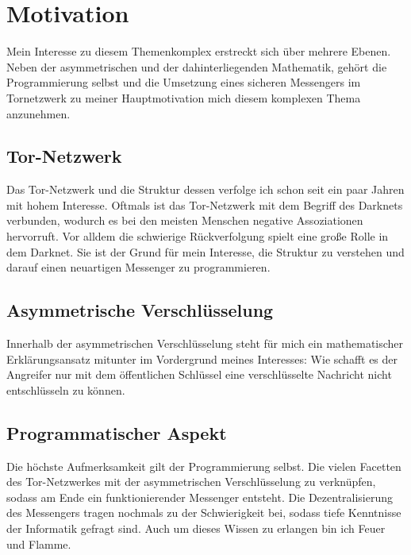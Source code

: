 \documentclass[a4paper,ngerman, headheight=28pt,12pt]{scrartcl}
\newcommand{\vcite}[1]{\cite[vgl.][]{#1}}
\begin{document}

\tableofcontents
\setcounter{page}{0}
\thispagestyle{empty}
\vspace{0.5cm}
\pagebreak

\linenumbers
\modulolinenumbers[5]

\section{Motivation}
Mein Interesse zu diesem Themenkomplex erstreckt sich über mehrere Ebenen. Neben der asymmetrischen und der dahinterliegenden Mathematik, gehört die Programmierung selbst und die Umsetzung eines sicheren Messengers im Tornetzwerk zu meiner Hauptmotivation mich diesem komplexen Thema anzunehmen.
\subsection{Tor-Netzwerk}
Das Tor-Netzwerk und die Struktur dessen verfolge ich schon seit ein paar Jahren mit hohem Interesse. Oftmals ist das Tor-Netzwerk mit dem Begriff des Darknets verbunden, wodurch es bei den meisten Menschen negative Assoziationen hervorruft. Vor alldem die schwierige Rückverfolgung spielt eine große Rolle in dem Darknet. Sie ist der Grund für mein Interesse, die Struktur zu verstehen und darauf einen neuartigen Messenger zu programmieren\vcite{texbook}.

\subsection{Asymmetrische Verschlüsselung}
Innerhalb der asymmetrischen Verschlüsselung steht für mich ein mathematischer Erklärungsansatz mitunter im Vordergrund meines Interesses: \glqq Wie schafft es der Angreifer nur mit dem öffentlichen Schlüssel eine verschlüsselte Nachricht nicht entschlüsseln zu können\grqq.

\subsection{Programmatischer Aspekt}
Die höchste Aufmerksamkeit gilt der Programmierung selbst. Die vielen Facetten des Tor-Netzwerkes mit der asymmetrischen Verschlüsselung zu verknüpfen, sodass am Ende ein funktionierender Messenger entsteht. Die Dezentralisierung des Messengers tragen nochmals zu der Schwierigkeit bei, sodass tiefe Kenntnisse der Informatik gefragt sind. Auch um dieses Wissen zu erlangen bin ich Feuer und Flamme.
\end{document}
